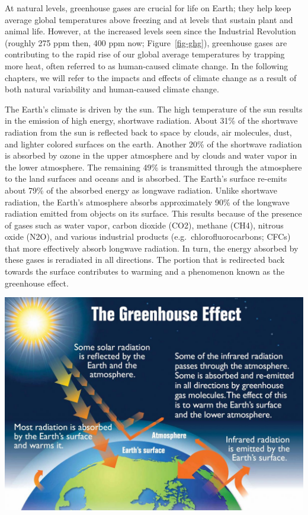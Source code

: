 \documentclass[
  letterpaper,
]{scrreprt}\usepackage{amsmath,amssymb}
\begin{document}
At natural levels, greenhouse gases are crucial for life on Earth; they
help keep average global temperatures above freezing and at levels that
sustain plant and animal life. However, at the increased levels seen
since the Industrial Revolution (roughly 275 ppm then, 400 ppm now;
Figure~\ref{fig-ghg}), greenhouse gases are contributing to the rapid
rise of our global average temperatures by trapping more heat, often
referred to as human-caused climate change. In the following chapters,
we will refer to the impacts and effects of climate change as a result
of both natural variability and human-caused climate change.

\begin{tcolorbox}[standard jigsaw,colbacktitle=quarto-callout-note-color!10!white, bottomtitle=1mm, toptitle=1mm, rightrule=.15mm, leftrule=.75mm, titlerule=0mm, title={The Greenhouse Effect}, arc=.35mm, bottomrule=.15mm, colframe=quarto-callout-note-color-frame, opacityback=0, opacitybacktitle=0.6, colback=white, left=2mm, toprule=.15mm, coltitle=black]
The Earth's climate is driven by the sun. The high temperature of the
sun results in the emission of high energy, shortwave radiation. About
31\% of the shortwave radiation from the sun is reflected back to space
by clouds, air molecules, dust, and lighter colored surfaces on the
earth. Another 20\% of the shortwave radiation is absorbed by ozone in
the upper atmosphere and by clouds and water vapor in the lower
atmosphere. The remaining 49\% is transmitted through the atmosphere to
the land surfaces and oceans and is absorbed. The Earth's surface
re-emits about 79\% of the absorbed energy as longwave radiation. Unlike
shortwave radiation, the Earth's atmosphere absorbs approximately 90\%
of the longwave radiation emitted from objects on its surface. This
results because of the presence of gases such as water vapor, carbon
dioxide (CO2), methane (CH4), nitrous oxide (N2O), and various
industrial products (e.g.~chlorofluorocarbons; CFCs) that more
effectively absorb longwave radiation. In turn, the energy absorbed by
these gases is reradiated in all directions. The portion that is
redirected back towards the surface contributes to warming and a
phenomenon known as the greenhouse effect.

\includegraphics{./assets/greenhouse-effect.jpg}
\end{tcolorbox}
\end{document}

